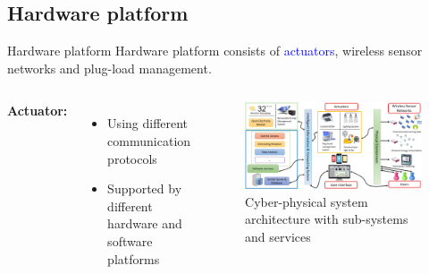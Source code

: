 \documentclass[aspectratio=169]{beamer}
\begin{document}
\subsection{Hardware platform}
\begin{frame}{Hardware platform}
    Hardware platform consists of \textcolor{blue}{actuators}, wireless sensor networks and plug-load management.
    \begin{columns}
        \textbf{Actuator:}
        \small{
            \begin{itemize}[label=$\circ$]
                \item Using different communication protocols
                \item Supported by different hardware and software platforms
            \end{itemize}
        }
        
        \begin{figure}
            \includegraphics[scale=0.2]{pic/cyber-physical-infrastructure.png}
            \caption{\footnotesize{Cyber-physical system architecture with sub-systems and services}}
        \end{figure}
    \end{columns}
\end{frame}
\end{document}
